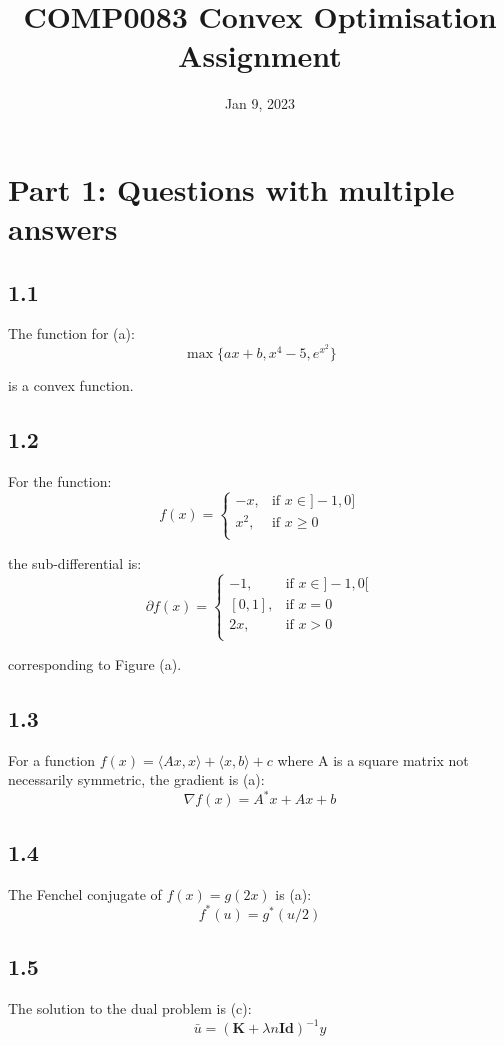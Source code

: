\documentclass[12pt]{article}
\title{\textbf{COMP0083 Convex Optimisation Assignment}}
\date{Jan 9, 2023}
\begin{document}
\maketitle
\section*{Part 1: Questions with multiple answers}
\subsection*{1.1}

The function for (a):
\[\max\{ax+b, x^4-5, e^{x^2}\}\]

is a convex function.

\subsection*{1.2}

For the function:
\[f(x) = \begin{cases}
      -x, & \text{if } x \in ]-1, 0] \\
      x^2, & \text{if } x \geq 0 \\
   \end{cases}\]

the sub-differential is:
\[\partial f(x) = \begin{cases}
      -1, & \text{if } x \in ]-1, 0[ \\
      \left[0, 1\right], & \text{if } x = 0  \\
      2x, & \text{if } x > 0 \\
   \end{cases}\]

corresponding to Figure (a).

\subsection*{1.3}
For a function $f(x) = \langle Ax, x \rangle + \langle x, b\rangle + c$ where A is a square matrix not necessarily symmetric, the gradient is (a):
\[\nabla f(x) = A^*x + Ax + b\]
\subsection*{1.4}
The Fenchel conjugate of $f(x) = g(2x)$ is (a):
\[f^*(u) = g^*(u/2)\]

\subsection*{1.5}
The solution to the dual problem is (c):
\[\bar{u} = (\textbf{K}+\lambda n \textbf{Id})^{-1} y\]
\end{document}
